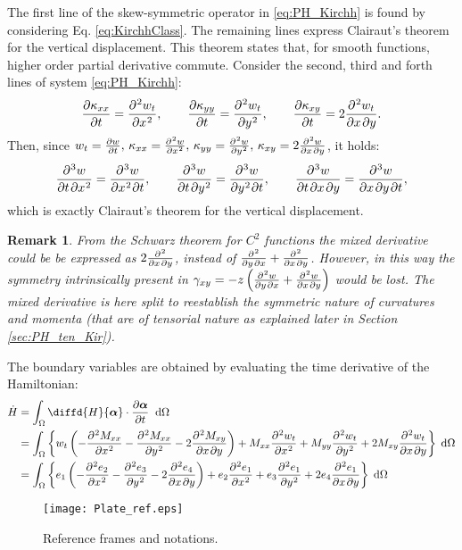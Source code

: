 \documentclass[preprint,12pt]{elsarticle}
\newtheorem{remark}{Remark}
\newcommand{\secondReviewer}[1]{\textcolor{blue!80!black}{#1}}
\begin{document}
\secondReviewer{ The first line of the skew-symmetric operator in \eqref{eq:PH_Kirchh} is found by considering Eq. \eqref{eq:KirchhClass}. The remaining lines express Clairaut’s theorem for the vertical displacement. This theorem states that, for smooth functions, higher order partial derivative commute. Consider the second, third and forth lines of system \eqref{eq:PH_Kirchh}:
\[ \diffp{\kappa_{xx}}{t} = \diffp[2]{w_t}{x}, \qquad \diffp{\kappa_{yy}}{t} = \diffp[2]{w_t}{y}, \qquad  \diffp{\kappa_{xy}}{t} = 2 \diffp{w_t}{x,y}.
\] Then, since $w_t = \diffp{w}{t}, \, \kappa_{xx} = \diffp[2]{w}{x}, \, \kappa_{yy} = \diffp[2]{w}{y}, \, \kappa_{xy} = 2 \diffp{w}{x, y}$, it holds:
\[ \diffp[1,2]{w}{t,x} = \diffp[2,1]{w}{x,t}, \qquad \diffp[1,2]{w}{t,y} = \diffp[2,1]{w}{y,t}, \qquad  \diffp{w}{t,x,y} = \diffp{w}{x,y,t},  
\] 
which is exactly Clairaut’s theorem for the vertical displacement.
}
\begin{remark}
	From the Schwarz theorem for $C^2$ functions the mixed derivative could be be expressed as $2 \diffp{}{x,y}$, instead of $\diffp{}{y,x} + \diffp{}{x,y}$. However, in this way the symmetry intrinsically present in $\gamma_{xy} = -z \left( \diffp{w}{y,x} + \diffp{w}{x,y} \right)$ would be lost. The mixed derivative is here split to reestablish the symmetric nature of curvatures and momenta (that are of tensorial nature as explained later in Section \ref{sec:PH_ten_Kir}).
\end{remark}
The boundary variables are obtained by evaluating the time derivative of the Hamiltonian:
\begin{align*}
\dot{H} &= \int_\Omega \diffd{H}{\bm{\alpha}}   \cdot \diffp{\bm{\alpha}}{t} \; \d{\Omega} \\
&= \int_\Omega \left\{ w_t \left(-\diffp[2]{M_{xx}}{x} -\diffp[2]{M_{xx}}{y} - 2 \diffp{M_{xy}}{x,y} \right) + M_{xx} \diffp[2]{w_t}{x} + M_{yy} \diffp[2]{w_t}{y} + 2 M_{xy} \diffp{w_t}{x,y} \right\} \d{\Omega} \\
&= \int_\Omega \left\{ e_1 \left(-\diffp[2]{e_2}{x} -\diffp[2]{e_3}{y} - 2 \diffp{e_4}{x,y}\right) + e_2 \diffp[2]{e_1}{x} + e_3 \diffp[2]{e_1}{y} + 2 e_4 \diffp{e_1}{x,y}  \right\} \d{\Omega}
\end{align*}

\begin{figure}[t]
	\centering
	\texttt{[image: Plate\_ref.eps]}
	\caption{Reference frames and notations.}
	\label{fig:plate_ref}
\end{figure}
\end{document}
